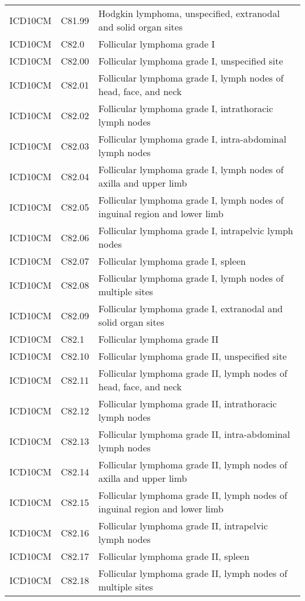 \begin{longtable}{p{}p{}p{}}
  ICD10CM & C81.99 & Hodgkin lymphoma, unspecified, extranodal and solid organ sites \\ 
  ICD10CM & C82.0 & Follicular lymphoma grade I \\ 
  ICD10CM & C82.00 & Follicular lymphoma grade I, unspecified site \\ 
  ICD10CM & C82.01 & Follicular lymphoma grade I, lymph nodes of head, face, and neck \\ 
  ICD10CM & C82.02 & Follicular lymphoma grade I, intrathoracic lymph nodes \\ 
  ICD10CM & C82.03 & Follicular lymphoma grade I, intra-abdominal lymph nodes \\ 
  ICD10CM & C82.04 & Follicular lymphoma grade I, lymph nodes of axilla and upper limb \\ 
  ICD10CM & C82.05 & Follicular lymphoma grade I, lymph nodes of inguinal region and lower limb \\ 
  ICD10CM & C82.06 & Follicular lymphoma grade I, intrapelvic lymph nodes \\ 
  ICD10CM & C82.07 & Follicular lymphoma grade I, spleen \\ 
  ICD10CM & C82.08 & Follicular lymphoma grade I, lymph nodes of multiple sites \\ 
  ICD10CM & C82.09 & Follicular lymphoma grade I, extranodal and solid organ sites \\ 
  ICD10CM & C82.1 & Follicular lymphoma grade II \\ 
  ICD10CM & C82.10 & Follicular lymphoma grade II, unspecified site \\ 
  ICD10CM & C82.11 & Follicular lymphoma grade II, lymph nodes of head, face, and neck \\ 
  ICD10CM & C82.12 & Follicular lymphoma grade II, intrathoracic lymph nodes \\ 
  ICD10CM & C82.13 & Follicular lymphoma grade II, intra-abdominal lymph nodes \\ 
  ICD10CM & C82.14 & Follicular lymphoma grade II, lymph nodes of axilla and upper limb \\ 
  ICD10CM & C82.15 & Follicular lymphoma grade II, lymph nodes of inguinal region and lower limb \\ 
  ICD10CM & C82.16 & Follicular lymphoma grade II, intrapelvic lymph nodes \\ 
  ICD10CM & C82.17 & Follicular lymphoma grade II, spleen \\ 
  ICD10CM & C82.18 & Follicular lymphoma grade II, lymph nodes of multiple sites \\ 

\end{longtable}
